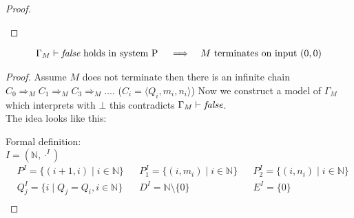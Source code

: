 \begin{proof}
\begin{figure}[H]
\end{figure}
\end{proof}
\begin{claim}
\begin{align*}
&\text{$\Gamma_M\vdash\emph{false}$ holds in system P} && \implies &\text{$M$ terminates on input $(0,0)$}
\end{align*}
\end{claim}
\begin{proof}
Assume $M$ does not terminate then there is an infinite chain $C_0\Rightarrow_M C_1\Rightarrow_M C_3\Rightarrow_M\dots$. ($C_i=\langle Q_i,m_i,n_i\rangle$) Now we construct a model of $\Gamma_M$ which interprets \false{} with $\bot$ this contradicts $\Gamma_M\vdash\emph{false}$.\\
The idea looks like this:\\
\begin{figure}[H]

\end{figure}
Formal definition:\\
$I=(\mathbb{N},\cdot^I)$
\begin{align*}
& P^I=\{(i+1,i)\mid i\in\mathbb{N}\} && P_1^I=\{(i,m_i)\mid i\in\mathbb{N}\} && P_2^I=\{(i,n_i)\mid i\in\mathbb{N}\}\\
& Q_j^I=\{i\mid Q_j=Q_i, i\in\mathbb{N}\} && D^I=\mathbb{N}\setminus\{0\} && E^I=\{0\}\\
\end{align*}
\end{proof}